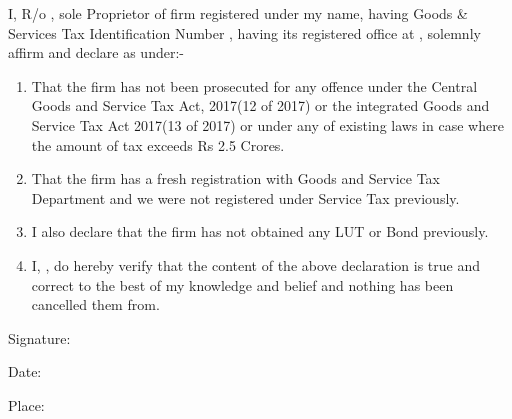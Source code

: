 \documentclass[a4paper,11pt] {report}
\begin{document}
\vspace*{2cm}
\bigbreak

I, \underline{\myname} R/o \underline{\myaddress}, sole Proprietor of
firm registered under my name, {\bf{\myfirm}} having Goods \& Services
Tax Identification Number {\bf{\underline{\mygstin}}}, having its
registered office at \myaddress, solemnly affirm and declare as
under:-

\begin{enumerate}
\item That the firm has not been prosecuted for any offence under the
  Central Goods and Service Tax Act, 2017(12 of 2017) or the
  integrated Goods and Service Tax Act 2017(13 of 2017) or under any
  of existing laws in case where the amount of tax exceeds Rs 2.5
  Crores.
\item That the firm has a fresh registration with Goods and Service
  Tax Department and we were not registered under Service Tax
  previously.
\item I also declare that the firm has not obtained any LUT or Bond
  previously.
\item I, \myname, do hereby verify that the content of the
  above declaration is true and correct to the best of my knowledge
  and belief and nothing has been cancelled them from.
\end{enumerate}

Signature:\bigbreak\bigbreak

\myname \bigbreak \bigbreak

Date: \DayAfter[2] \smallbreak

Place: \myplace
\end{document}
